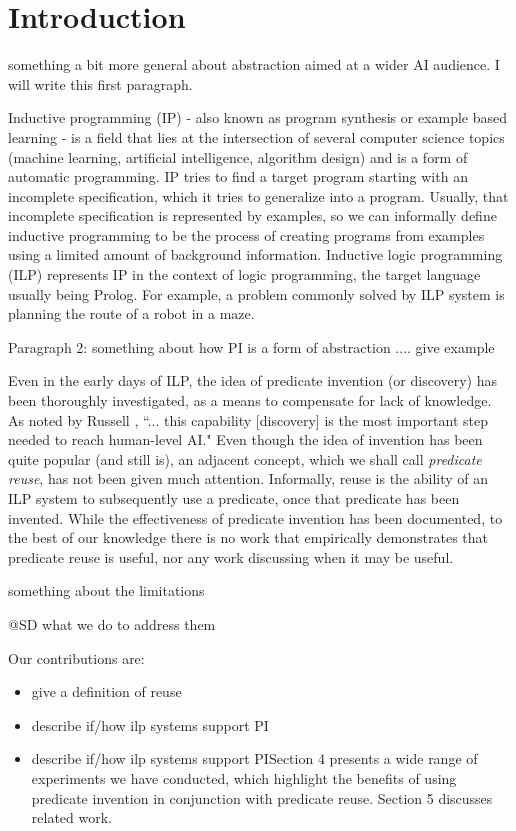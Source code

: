 \section{Introduction}

\ac{something a bit more general about abstraction aimed at a wider AI audience. I will write this first paragraph.}

Inductive programming (IP) \cite{indprogmeets} - also known as program synthesis or example based learning - is a field that lies at the intersection of several computer science topics (machine learning, artificial intelligence, algorithm design) and is a form of automatic programming. IP tries to find a target program starting with an incomplete specification, which it tries to generalize into a program. Usually, that incomplete specification is represented by examples, so we can informally define inductive programming to be the process of creating programs from examples using a limited amount of background information. Inductive logic programming (ILP) represents IP in the context of logic programming, the target language usually being Prolog. For example, a problem commonly solved by ILP system is planning the route of a robot in a maze.

\ac{Paragraph 2: something about how PI is a form of abstraction ....}
\ac{give example}

\par Even in the early days of ILP, the idea of predicate invention (or discovery) has been thoroughly investigated, as a means to compensate for lack of knowledge. As noted by Russell \cite{humancompatible}, ``... this capability [discovery] is the most important step needed to reach human-level AI." Even though the idea of invention has been quite popular (and still is), an adjacent concept, which we shall call \emph{predicate reuse}, has not been given much attention. Informally, reuse is the ability of an ILP system to subsequently use a predicate, once that predicate has been invented. While the effectiveness of predicate invention has been documented, to the best of our knowledge there is no work that empirically demonstrates that predicate reuse is useful, nor any work discussing when it may be useful.

\ac{something about the limitations}

\ac{@SD what we do to address them}

Our contributions are:

\begin{itemize}
\item \ac{give a definition of reuse}

\item \ac{describe if/how ilp systems support PI}

\item \ac{describe if/how ilp systems support PI}Section 4 presents a wide range of experiments we have conducted, which highlight the benefits of using predicate invention in conjunction with predicate reuse. Section 5 discusses related work.
\end{itemize}
